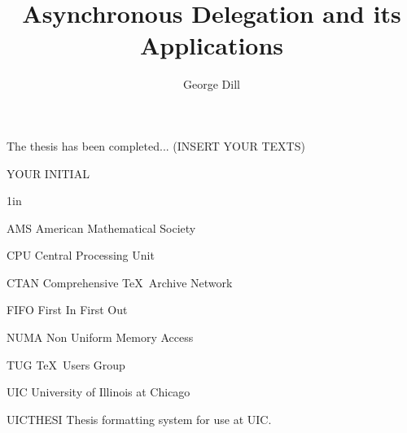 \documentclass{uicthesi}
\begin{document}

\title{Asynchronous Delegation and its Applications}
\author{George Dill}
\maketitle




 \acknowledgements
{The thesis has been completed... (INSERT YOUR TEXTS)\\ 

\begin{flushright}YOUR INITIAL\end{flushright}}


\preface


\tableofcontents
\listoftables
\listoffigures
\listofabbreviations
\begin{list}
{}
{\setlength
  {}{1in}
    \setlength{\leftmargin}{1.5in}
    \setlength{\labelsep}{.5in}
    \setlength{\rightmargin}{\leftmargin}}
\item[AMS\hfill] American Mathematical Society
\item[CPU\hfill] Central Processing Unit
\item[CTAN\hfill] Comprehensive \TeX\ Archive Network
\item[FIFO\hfill] First In First Out
\item[NUMA\hfill] Non Uniform Memory Access
\item[TUG\hfill] \TeX\ Users Group
\item[UIC\hfill] University of Illinois at Chicago
\item[UICTHESI\hfill] Thesis formatting system for use at UIC.
\end{list}
 
\end{document}
